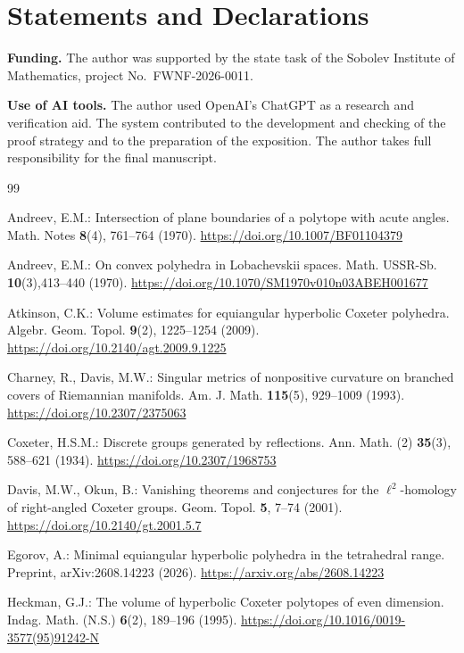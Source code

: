 \documentclass[12pt,a4paper]{article}
\theoremstyle{thmstyleone}
\theoremstyle{thmstylethree}
\theoremstyle{thmstyletwo}
\begin{document}
\section*{Statements and Declarations}

\noindent\textbf{Funding.}
The author was supported by the state task of the Sobolev Institute of
Mathematics, project No.~FWNF-2026-0011.


\noindent\textbf{Use of AI tools.}
The author used OpenAI's ChatGPT as a research and verification aid. The system contributed to the development and checking of the proof strategy and to the preparation of the exposition. The author takes full responsibility for the final manuscript.

\begin{thebibliography}{99}

Andreev, E.M.: Intersection of plane boundaries of a polytope with acute
angles. Math. Notes \textbf{8}(4), 761--764 (1970).
\url{https://doi.org/10.1007/BF01104379}

Andreev, E.M.: On convex polyhedra in Lobachevskii spaces. Math. USSR-Sb. \textbf{10}(3),413--440 (1970).
\url{https://doi.org/10.1070/SM1970v010n03ABEH001677}

Atkinson, C.K.: Volume estimates for equiangular hyperbolic Coxeter
polyhedra. Algebr. Geom. Topol. \textbf{9}(2), 1225--1254 (2009).
\url{https://doi.org/10.2140/agt.2009.9.1225}

Charney, R., Davis, M.W.: Singular metrics of nonpositive curvature on
branched covers of Riemannian manifolds. Am. J. Math. \textbf{115}(5),
929--1009 (1993). \url{https://doi.org/10.2307/2375063}

Coxeter, H.S.M.: Discrete groups generated by reflections. Ann. Math. (2)
\textbf{35}(3), 588--621 (1934).
\url{https://doi.org/10.2307/1968753}

Davis, M.W., Okun, B.: Vanishing theorems and conjectures for the
$\ell^2$-homology of right-angled Coxeter groups. Geom. Topol. \textbf{5},
7--74 (2001). \url{https://doi.org/10.2140/gt.2001.5.7}

Egorov, A.: Minimal equiangular hyperbolic polyhedra in the tetrahedral
range. Preprint, arXiv:2608.14223 (2026).
\url{https://arxiv.org/abs/2608.14223}

Heckman, G.J.: The volume of hyperbolic Coxeter polytopes of even
dimension. Indag. Math. (N.S.) \textbf{6}(2), 189--196 (1995).
\url{https://doi.org/10.1016/0019-3577(95)91242-N}


\end{thebibliography}
\end{document}
